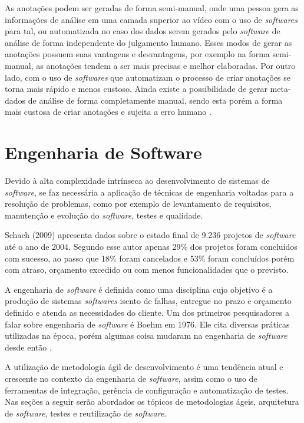 As anotações podem ser geradas de forma semi-manual, onde uma pessoa gera as informações de análise em uma camada superior ao vídeo com o uso de \textit{softwares} para tal, ou automatizada no caso dos dados serem gerados pelo \textit{software} de análise de forma independente do julgamento humano. Esses modos de gerar as anotações possuem suas vantagens e desvantagens, por exemplo na forma semi-manual, as anotações tendem a ser mais precisas e melhor elaboradas. Por outro lado, com o uso de \textit{softwares} que automatizam o processo de criar anotações se torna mais rápido e menos custoso. Ainda existe a possibilidade de gerar meta-dados de análise de forma completamente manual, sendo esta porém a forma mais custosa de criar anotações e sujeita a erro humano \cite{sadallah2012}.

\section{Engenharia de Software}

Devido à alta complexidade intrínseca ao desenvolvimento de sistemas de \textit{software}, se faz necessária a aplicação de técnicas de engenharia voltadas para a resolução de problemas, como por exemplo de levantamento de requisitos, manutenção e evolução do \textit{software}, testes e qualidade. 

Schach (2009) apresenta dados sobre o estado final de 9.236 projetos de \textit{software} até o ano de 2004. Segundo esse autor apenas 29\% dos projetos foram concluídos com sucesso, ao passo que 18\% foram cancelados e 53\% foram concluídos porém com atraso, orçamento excedido ou com menos funcionalidades que o previsto.

A engenharia de \textit{software} é definida como uma disciplina cujo objetivo é a produção de sistemas \textit{softwares} isento de falhas, entregue no prazo e orçamento definido e atenda as necessidades do cliente. Um dos primeiros pesquisadores a falar sobre engenharia de \textit{software} é  Boehm em 1976. Ele cita diversas práticas utilizadas na época, porém algumas coisa mudaram na engenharia de \textit{software} desde então \cite{schach2009, boehm1976}.

A utilização de metodologia ágil de desenvolvimento é uma tendência atual e crescente no contexto da engenharia de \textit{software}, assim como o uso de ferramentas de integração, gerência de configuração e automatização de testes. Nas seções a seguir serão abordados os tópicos de metodologias ágeis, arquitetura de \textit{software}, testes e reutilização de \textit{software}.

